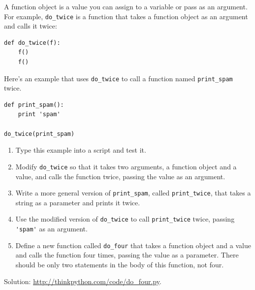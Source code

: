 \documentclass[10pt]{book}
\begin{document}
\begin{exercise}

A function object is a value you can assign to a variable
or pass as an argument.  For example, \verb"do_twice" is a function
that takes a function object as an argument and calls it twice:

\begin{verbatim}
def do_twice(f):
    f()
    f()
\end{verbatim}

Here's an example that uses \verb"do_twice" to call a function
named \verb"print_spam" twice.

\begin{verbatim}
def print_spam():
    print 'spam'

do_twice(print_spam)
\end{verbatim}

\begin{enumerate}

\item Type this example into a script and test it.

\item Modify \verb"do_twice" so that it takes two arguments, a
function object and a value, and calls the function twice,
passing the value as an argument.

\item Write a more general version of \verb"print_spam", called
\verb"print_twice", that takes a string as a parameter and prints
it twice.

\item Use the modified version of \verb"do_twice" to call
\verb"print_twice" twice, passing \verb"'spam'" as an argument.

\item Define a new function called 
\verb"do_four" that takes a function object and a value
and calls the function four times, passing the value
as a parameter.  There should be only
two statements in the body of this function, not four.

\end{enumerate}

Solution: \url{http://thinkpython.com/code/do_four.py}.

\end{exercise}
\end{document}
